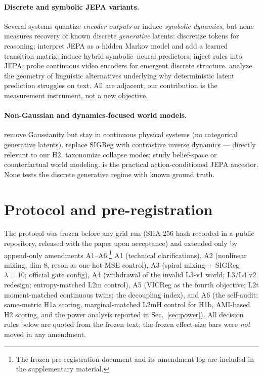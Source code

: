 \documentclass[10pt]{article}
\begin{document}
\paragraph{Discrete and symbolic JEPA variants.}
Several systems quantize \emph{encoder outputs} or induce \emph{symbolic
dynamics}, but none measures recovery of known discrete \emph{generative}
latents: \citet{discretejepa2025} discretize tokens for reasoning;
\citet{mcjepa2026} interpret JEPA as a hidden Markov model and add a learned
transition matrix; \citet{sjepa2026} induce hybrid symbolic--neural predictors;
\citet{rijepa2026} inject rules into JEPA; \citet{aimprobing2026} probe
continuous video encoders for emergent discrete structure. \citet{jepaparadox2026}
analyze the geometry of linguistic alternatives underlying why deterministic
latent prediction struggles on text. All are adjacent;
our contribution is the measurement instrument, not a new objective.

\paragraph{Non-Gaussian and dynamics-focused world models.}
\citet{arya2026} remove Gaussianity but stay in continuous physical systems
(no categorical generative latents). \citet{nogaussian2026} replace SIGReg with
contrastive inverse dynamics --- directly relevant to our H2. \citet{phylatent2026}
taxonomize collapse modes; \citet{uwmjepa2026b,causaljepa2026,dsge2026} study
belief-space or counterfactual world modeling. \citet{leworldmodel2026} is the
practical action-conditioned JEPA ancestor. None tests the discrete generative
regime with known ground truth.

\section{Protocol and pre-registration}
\label{sec:protocol}
The protocol was frozen before any
grid run (SHA-256 hash recorded in a public repository, released with the
paper upon acceptance) and extended only by
append-only amendments A1--A6:\footnote{The frozen pre-registration document
and its amendment log are included in the supplementary material.}
A1 (technical clarifications), A2 (nonlinear mixing, dim 8, recon as
one-hot-MSE control), A3 (spiral mixing + SIGReg $\lambda{=}10$; official gate
config), A4 (withdrawal of the invalid L3-v1 world; L3/L4 v2 redesign;
entropy-matched L2m control), A5 (VICReg as the fourth objective; L2t
moment-matched continuous twins; the decoupling index), and A6 (the self-audit:
same-metric H1a scoring, marginal-matched L2mH control for H1b, AMI-based H2
scoring, and the power analysis reported in Sec.~\ref{sec:power}).
All decision rules below are quoted from the frozen text; the frozen
effect-size bars were \emph{not} moved in any amendment.
\end{document}
